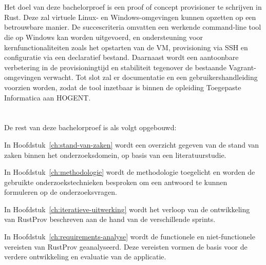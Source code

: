 \section{}%
\label{sec:onderzoeksdoelstelling}


Het doel van deze bachelorproef is een proof of concept provisioner te schrijven in Rust. Deze zal virtuele Linux- en Windows-omgevingen kunnen opzetten op een betrouwbare manier. De succescriteria omvatten een werkende command-line tool die op Windows kan worden uitgevoerd, en ondersteuning voor kernfunctionaliteiten zoals het opstarten van de VM, provisioning via SSH en configuratie via een declaratief bestand. Daarnaast wordt een aantoonbare verbetering in de provisioningtijd en stabiliteit tegenover de bestaande Vagrant-omgevingen verwacht. Tot slot zal er documentatie en een gebruikershandleiding voorzien worden, zodat de tool inzetbaar is binnen de opleiding Toegepaste Informatica aan HOGENT.
\section{}%
\label{sec:opzet-bachelorproef}


De rest van deze bachelorproef is als volgt opgebouwd:

In Hoofdstuk~\ref{ch:stand-van-zaken} wordt een overzicht gegeven van de stand van zaken binnen het onderzoeksdomein, op basis van een literatuurstudie.

In Hoofdstuk~\ref{ch:methodologie} wordt de methodologie toegelicht en worden de gebruikte onderzoekstechnieken besproken om een antwoord te kunnen formuleren op de onderzoeksvragen.

In Hoofdstuk~\ref{ch:iteratieve-uitwerking} wordt het verloop van de ontwikkeling van RustProv beschreven aan de hand van de verschillende sprints.

In Hoofdstuk~\ref{ch:requirements-analyse} wordt de functionele en niet-functionele vereisten van RustProv geanalyseerd. Deze vereisten vormen de
basis voor de verdere ontwikkeling en evaluatie van de applicatie.

